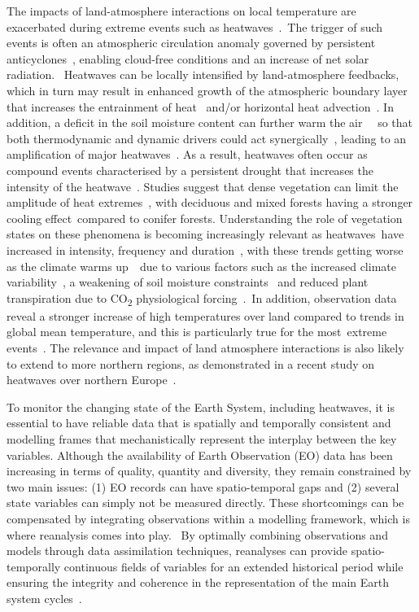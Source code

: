 \documentclass[gmd, manuscript]{copernicus}
\begin{document}
The impacts of land-atmosphere interactions on local temperature are
exacerbated during extreme events such as
heatwaves~\citep{jia2019land}.~The trigger of such events is often an
atmospheric circulation anomaly governed by persistent
anticyclones~\citep{schubert2014northern, brunner2018}, enabling cloud-free conditions and an 
increase 
of net solar radiation.~ Heatwaves can be locally intensified
by land-atmosphere feedbacks, which in turn may result in enhanced
growth of the atmospheric boundary layer that increases the entrainment
of heat~\citep{Miralles_2011} and/or horizontal heat
advection~\citep{schumacher2019amplification}. In addition, a deficit in the soil
moisture content can further warm the air~\citep{hauser2016role}~ so that
both thermodynamic and dynamic drivers could act
synergically~\citep{coumou2018influence}, leading to an amplification of major
heatwaves~\citep{horton2016review}. As a result, heatwaves often occur
as compound events characterised by a persistent drought that increases
the intensity of the heatwave~\citep[e.g.][]{miralles2012soil,Seneviratne_2010}. Studies
suggest that dense vegetation can limit the amplitude of heat
extremes~\citep{renaud2009comparison}, with deciduous and mixed forests having a
stronger cooling effect~compared to conifer forests. Understanding the
role of vegetation states on these phenomena is becoming increasingly
relevant as heatwaves~have increased in intensity, frequency and
duration~\citep{perkins2020increasing}, with these trends getting worse as the
climate warms up~\citep{christidis2015,coumou2018influence}~due to various factors such as the
increased climate variability~\citep{schar2004role}, a weakening of soil
moisture constraints~\citep{Rasmijn_2018} and reduced plant transpiration
due to CO\textsubscript{2} physiological forcing~\citep{skinner2018amplificationa}.~In
addition, observation data reveal a stronger increase of high
temperatures over land compared to trends in global mean temperature,
and this is particularly true for the most~extreme
events~\citep{seneviratne2014no}. The relevance and impact of land atmosphere
interactions is also likely to extend to more northern regions, as
demonstrated in a recent study on heatwaves over northern
Europe~\citep{Dirmeyer_2021}.

To monitor the changing state of the Earth System, including heatwaves,
it is essential to have reliable data that is spatially and temporally
consistent and modelling frames that mechanistically represent the
interplay between the key variables. Although the availability of Earth
Observation (EO) data has been increasing in terms of quality, quantity
and diversity, they remain constrained by two main issues: (1) EO
records can have spatio-temporal gaps and (2) several state variables
can simply not be measured directly. These shortcomings can be
compensated by integrating observations within a modelling framework,
which is where {reanalysis }comes into play.~ By optimally combining
observations and models through data assimilation techniques, reanalyses
can provide spatio-temporally continuous fields of variables for an
extended historical period while ensuring the integrity and coherence in
the representation of the main Earth system cycles~\citep{Hersbach_2020, Dee_2011}.
\end{document}
